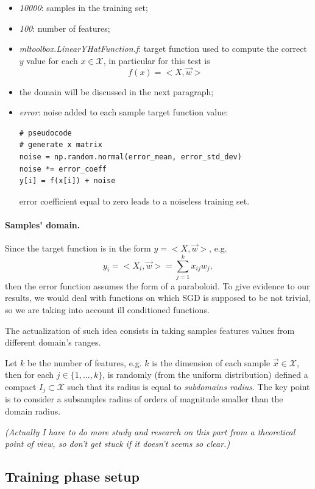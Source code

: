 \documentclass[a4paper,12pt]{article}
\theoremstyle{newplanestyle}
\theoremstyle{newdefinitionstyle}
\theoremstyle{newprovestyle}
\begin{document}
\begin{itemize}
\item \textit{10000}: samples in the training set;
\item \textit{100}: number of features;
\item \textit{mltoolbox.LinearYHatFunction.f}: target function used to compute the correct $y$ value for each $x \in \mathcal{X}$, in particular for this test is
\[f(x) = <X, \vec{w}>\]
\item the domain will be discussed in the next paragraph;
\item \textit{error}: noise added to each sample target function value:
\begin{lstlisting}
# pseudocode
# generate x matrix
noise = np.random.normal(error_mean, error_std_dev)
noise *= error_coeff
y[i] = f(x[i]) + noise
\end{lstlisting}
error coefficient equal to zero leads to a noiseless training set.
\end{itemize}

\paragraph*{Samples' domain.}
Since the target function is in the form $y=<X,\vec{w}>$, e.g.
\begin{equation*}
y_i = <X_i, \vec{w}> = \sum_{j=1}^{k}x_{ij}w_j,
\end{equation*}
then the error function assumes the form of a paraboloid.
To give evidence to our results, we would deal with functions on which SGD is supposed to be not trivial, so we are taking into account ill conditioned functions.

The actualization  of such idea consists in taking samples features values from different domain's ranges.

Let $k$ be the number of features, e.g. $k$ is the dimension of each sample $\vec{x} \in \mathcal{X}$, then for each $j \in \{1,...,k\}$, is randomly (from the uniform distribution) defined a compact $I_j \subset \mathcal{X}$ such that its radius is equal to \textit{subdomains radius}. The key point is to consider a subsamples radius of orders of magnitude smaller than the domain radius.

\textit{(Actually I have to do more study and research on this part from a theoretical point of view, so don't get stuck if it doesn't seems so clear.)} 

\subsection*{Training phase setup}
\end{document}
